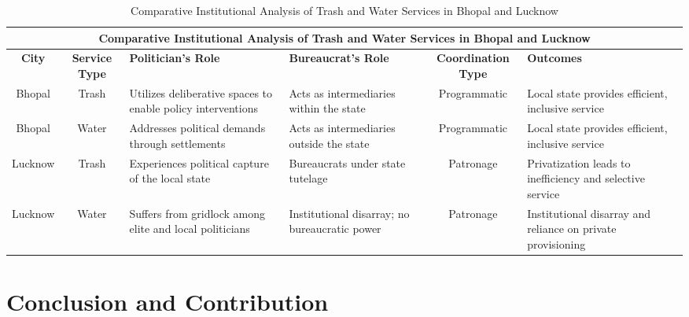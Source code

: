 \begin{table}[h!]
    \centering
    \small %
    \renewcommand{\arraystretch}{1.3} %
    \setlength{\tabcolsep}{5pt} %

    \begin{adjustbox}{max width=\textwidth} %
        \begin{tabular}{|c|c|p{3.2cm}|p{3.2cm}|c|p{3.2cm}|}
            \hline
            \multicolumn{6}{|c|}{\textbf{Comparative Institutional Analysis of Trash and Water Services in Bhopal and Lucknow}} \\
            \hline
            \textbf{City} & \textbf{Service Type} & \textbf{Politician's Role} & \textbf{Bureaucrat's Role} & \textbf{Coordination Type} & \textbf{Outcomes} \\
            \hline
            Bhopal & Trash & Utilizes deliberative spaces to enable policy interventions & Acts as intermediaries within the state & \cellcolor{green!20} Programmatic & Local state provides efficient, inclusive service \\
            \hline
            Bhopal & Water & Addresses political demands through settlements & Acts as intermediaries outside the state & \cellcolor{green!20} Programmatic & Local state provides efficient, inclusive service \\
            \hline
            Lucknow & Trash & Experiences political capture of the local state & Bureaucrats under state tutelage & \cellcolor{red!20} Patronage & Privatization leads to inefficiency and selective service \\
            \hline
            Lucknow & Water & Suffers from gridlock among elite and local politicians & Institutional disarray; no bureaucratic power & \cellcolor{red!20} Patronage & Institutional disarray and reliance on private provisioning \\
            \hline
        \end{tabular}
    \end{adjustbox}

    \caption{Comparative Institutional Analysis of Trash and Water Services in Bhopal and Lucknow}
\end{table}





\section{Conclusion and Contribution}

